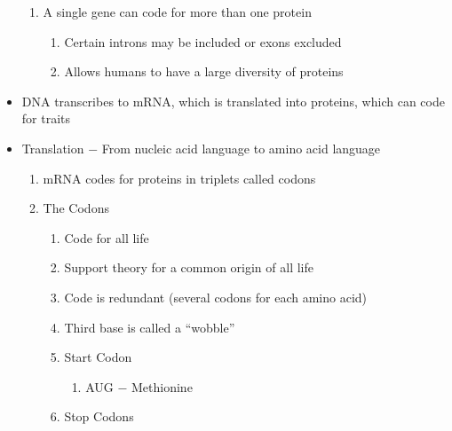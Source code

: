 \documentclass[12pt]{article}
\begin{document}
\begin{itemize}
\begin{enumerate}
    \item A single gene can code for more than one protein

      \begin{enumerate}

        \item Certain introns may be included or exons excluded

        \item Allows humans to have a large diversity of proteins

      \end{enumerate}

  \end{enumerate}

\item DNA transcribes to mRNA, which is translated into proteins, which can code for traits

\item Translation $-$ From nucleic acid language to amino acid language

  \begin{enumerate}

    \item mRNA codes for proteins in triplets called codons

    \item The Codons

      \begin{enumerate}

        \item Code for all life

        \item Support theory for a common origin of all life

        \item Code is redundant (several codons for each amino acid)

        \item Third base is called a ``wobble''

        \item Start Codon

          \begin{enumerate}

            \item AUG $-$ Methionine

          \end{enumerate}

        \item Stop Codons

          \begin{enumerate}


\end{enumerate}
\end{enumerate}
\end{enumerate}
\end{itemize}
\end{document}
